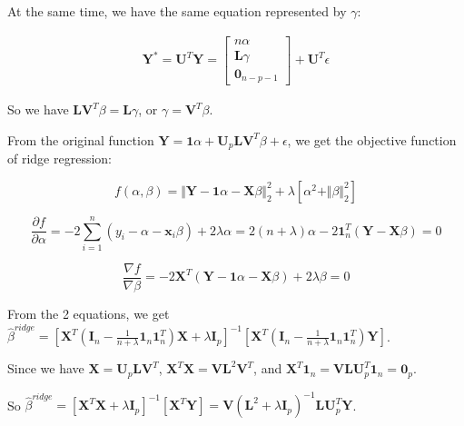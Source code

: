 \documentclass[paper=letter, fontsize=12pt]{article}
\begin{document}
\begin{enumerate}[label=(\alph*)]
	At the same time, we have the same equation represented by $\gamma$:
	
	\begin{eqnarray*}
	\mathbf{Y}^* = \mathbf{U}^{T} \mathbf{Y} = 
		\begin{bmatrix}
			n\alpha \\
			\mathbf{L} \gamma \\
			\mathbf{0}_{n-p-1}
		\end{bmatrix} + \mathbf{U}^T \epsilon
	\end{eqnarray*}

	So we have $\mathbf{L} \mathbf{V}^T \beta = \mathbf{L} \gamma$, or $\gamma = \mathbf{V}^{T} \beta$.
	
	From the original function $\mathbf{Y} = \mathbf{1} \alpha + \mathbf{U}_{p} \mathbf{L} \mathbf{V}^{T} \beta + \epsilon$, we get the objective function of ridge regression:
	
	\begin{equation*}
	f(\alpha, \beta) = \Vert \mathbf{Y} - \mathbf{1} \alpha - \mathbf{X} \beta \Vert_2^2 + \lambda [\alpha^2 + \Vert \beta \Vert_2^2]
	\end{equation*}
	
	\begin{equation*}
	\frac{\partial f}{\partial \alpha} = -2 \sum_{i = 1}^{n} (y_i - \alpha - \mathbf{x}_i \beta) + 2 \lambda \alpha = 2(n + \lambda) \alpha -2 \mathbf{1}^{T}_{n} (\mathbf{Y} - \mathbf{X} \beta)  = 0
	\end{equation*}
	
	\begin{equation*}
	\frac{\nabla f}{\nabla \beta} = -2 \mathbf{X}^{T} (\mathbf{Y} - \mathbf{1} \alpha - \mathbf{X} \beta) + 2 \lambda \beta = 0
	\end{equation*}
	
	From the 2 equations, we get $\hat{\beta}^{ridge} = [\mathbf{X}^{T} (\mathbf{I}_n - \frac{1}{n + \lambda} \mathbf{1}_n \mathbf{1}_n^{T}) \mathbf{X} + \lambda \mathbf{I}_p]^{-1} [\mathbf{X}^{T} (\mathbf{I}_{n} - \frac{1}{n + \lambda} \mathbf{1}_n \mathbf{1}_n^{T}) \mathbf{Y}]$.
	
	Since we have $\mathbf{X} = \mathbf{U}_p \mathbf{L} \mathbf{V}^{T}$, $\mathbf{X}^{T} \mathbf{X} = \mathbf{V} \mathbf{L}^2 \mathbf{V}^{T}$, and $\mathbf{X}^{T} \mathbf{1}_{n} = \mathbf{V} \mathbf{L} \mathbf{U}^{T}_{p} \mathbf{1}_n = \mathbf{0}_{p}$.
	
	So $\hat{\beta}^{ridge} = [\mathbf{X}^{T} \mathbf{X} + \lambda \mathbf{I}_p]^{-1} [\mathbf{X}^{T} \mathbf{Y}] = \mathbf{V} (\mathbf{L}^2 + \lambda \mathbf{I}_{p})^{-1} \mathbf{L} \mathbf{U}^{T}_{p} \mathbf{Y}$. 
	

\end{enumerate}
\end{document}
